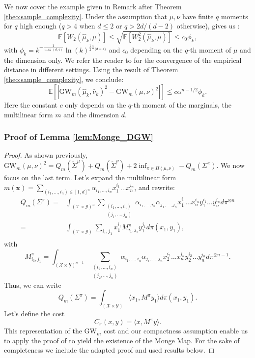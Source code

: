 \documentclass{article}
\newcommand{\Y}{\mathcal{Y}}
\newcommand{\X}{\mathcal{X}}
\newcommand{\1}{\mathbf{1}}
\newcommand{\GW}{\mathrm{GW}}
\theoremstyle{definition}
\theoremstyle{remark}
\begin{document}
\begin{appendices}
We now cover the example given in Remark after Theorem \ref{theo:sample_complexity}. Under the assumption that $\mu,\nu$ have finite $q$ moments for $q$ high enough ($q>4$ when $d\leq 2$ or $q>2d/(d-2)$ otherwise), \cite[Theorem 1]{fournier2015rate} gives us :
\[\mathbb{E}[W_2(\hat{\mu}_k,\mu)]\leq \sqrt{\mathbb{E}[W_2^2(\hat{\mu}_k,\mu)]}\leq c_0 \phi_k,\]
with  $\phi_k = k^{-\frac{1}{\max(d,4)}}\ln(k)^{\frac{1}{2}\1_{\{d=4\}}}$ and $c_0$ depending on the $q$-th moment of $\mu$ and the dimension only. We refer the reader to \cite{weed2019sharp} for the convergence of the empirical distance in different settings. Using the result of Theorem \ref{theo:sample_complexity}, we conclude:
\[\mathbb{E}[|\GW_m(\hat{\mu}_k,\hat{\nu}_k)^2-\GW_m(\mu,\nu)^2|]\leq c \alpha^{n-1/2} \phi_k.\]
Here the constant $c$ only depends on the $q$-th moment of the marginals, the multilinear form $m$ and the dimension $d$.

\subsubsection*{Proof of Lemma \ref{lem:Monge_DGW}}
\begin{proof}
    As shown previously, $\GW_m(\mu,\nu)^2=Q_m(\tilde{\Sigma}^\mu)+Q_m(\tilde{\Sigma}^\nu)+2 \inf_{\pi\in\Pi(\mu,\nu)} -Q_m(\Sigma^\pi)$. 
    We now focus on the last term. Let's expand the multilinear form  
    $m(\mathbf{x})=\sum_{(i_1,\dots,i_n)\in [1,d]^n}\alpha_{i_1,\dots,i_n}x_1^{i_1}\dots x_n^{i_n}$,
    and rewrite:
    \begin{equation*}
        \begin{split}
            Q_m(\Sigma^\pi)
            =&\int_{(\X\times\Y)^n}\sum_{\substack{(i_1,\dots,i_n)\\(j_1,\dots,j_n)}}\alpha_{i_1,\dots,i_n}\alpha_{j_1,\dots,j_n}x_1^{i_1}\dots x_n^{i_n}y_1^{i_1}\dots y_n^{i_n}d\pi^{\otimes n}\\
            =&\int_{(\X\times\Y)}\sum_{i_1,j_1}x_1^{i_1}M^\pi_{i_1,j_1}y_1^{j_1}d\pi(x_1,y_1),\\
        \end{split}
    \end{equation*}
    with \[M^\pi_{i_1,j_1}=\int_{(\X\times\Y)^{n-1}}\sum_{\substack{(i_2,\dots,i_n)\\(j_2,\dots,j_n)}}\alpha_{i_1,\dots,i_n}\alpha_{j_1,\dots,j_n}x_2^{i_2}\dots x_n^{i_n}y_2^{i_2}\dots y_n^{i_n}d\pi^{\otimes n-1}.\]
    Thus, we can write \[Q_m(\Sigma^\pi) = \int_{(\X\times\Y)}\langle x_1,M^\pi y_1\rangle d\pi(x_1,y_1).\]
    Let's define the cost \[C_{\pi}(x, y) = \langle x,M^\pi y\rangle.\]
    This representation of the $\GW_m$ cost and our compactness assumption enable us to apply the proof of  \cite[Theorem 3.2]{dumont2025existence} to yield the existence of the Monge Map. For the sake of completeness we include the adapted proof and used results below.


\end{proof}
\end{appendices}
\end{document}
